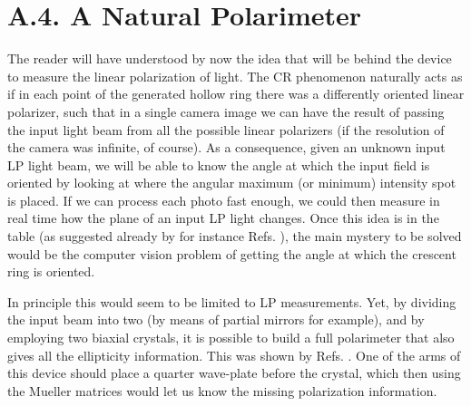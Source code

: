 \documentclass[11pt, a4paper, twoside]{article} %
\begin{document}
\section*{A.4. A Natural Polarimeter\vspace{-0.1cm}}
The reader will have understood by now the idea that will be behind the device to measure the linear polarization of light. The CR phenomenon naturally acts as if in each point of the generated hollow ring there was a differently oriented linear polarizer, such that in a single camera image we can have the result of passing the input light beam from all the possible linear polarizers (if the resolution of the camera was infinite, of course). As a consequence, given an unknown input LP light beam, we will be able to know the angle at which the input field is oriented by looking at where the angular maximum (or minimum) intensity spot is placed. If we can process each photo fast enough, we could then measure in real time how the plane of an input LP light changes. Once this idea is in the table (as suggested already by for instance Refs. \cite{Stokes1, Stokes2, incomplete}), the main mystery to be solved would be the computer vision problem of getting the angle at which the crescent ring is oriented.

In principle this would seem to be limited to LP measurements. Yet, by dividing the input beam into two (by means of partial mirrors for example), and by employing two biaxial crystals, it is possible to build a full polarimeter that also gives all the ellipticity information. This was shown by Refs. \cite{Stokes1, Stokes2}. One of the arms of this device should place a quarter wave-plate before the crystal, which then using the Mueller matrices would let us know the missing polarization information.
\end{document}

